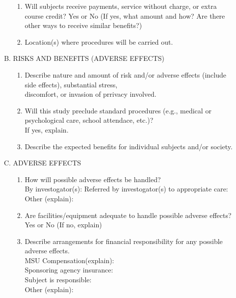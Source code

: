 \documentclass{article}
\begin{document}
\begin{enumerate}[I.]
\begin{enumerate}[A.]
\begin{enumerate}[1.]
            \item Will subjects receive payments, service without charge, or extra course credit? Yes or No 
            (If yes, what amount and how? Are there other ways to receive similar benefits?) \\
            
            \item Location(s) where procedures will be carried out. \\
        \end{enumerate}

        \item RISKS AND BENEFITS (ADVERSE EFFECTS) 
        \begin{enumerate}[1.]
            \item Describe nature and amount of risk and/or adverse effects (include side effects), substantial stress,\\
            discomfort, or invasion of prrivacy involved. \\
            
            \item Will this study preclude standard procedures (e.g., medical or psychological care, school attendace, etc.)?\\
            If yes, explain. \\

            \item Describe the expected benefits for individual subjects and/or society. \\
            
        \end{enumerate}
        \item ADVERSE EFFECTS
        \begin{enumerate}[1.]
            \item How will possible adverse effects be handled?\\ 
            By investogator(s):
            Referred by investogator(s) to appropriate care:
            Other (explain):\\

            \item Are facilities/equipment adequate to handle possible adverse effects? Yes or No 
            (If no, explain)\\

            \item Describe arrangements for financial responsibility for any possible adverse effects.\\
            MSU Compensation(explain): \\
            Sponsoring agency insurance: \\
            Subject is responsible: \\
            Other (explain): \\


\end{enumerate}
\end{enumerate}
\end{enumerate}
\end{document}
